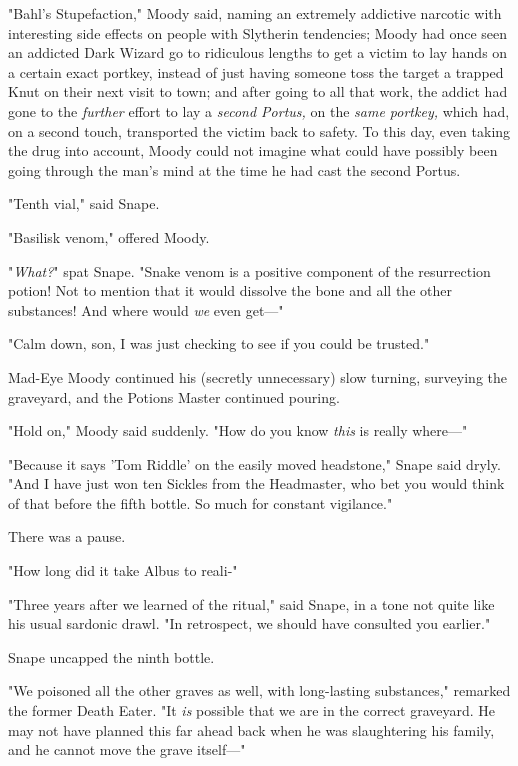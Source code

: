 "Bahl's Stupefaction," Moody said, naming an extremely addictive narcotic with 
interesting side effects on people with Slytherin tendencies; Moody had once 
seen an addicted Dark Wizard go to ridiculous lengths to get a victim to lay 
hands on a certain exact portkey, instead of just having someone toss the 
target a trapped Knut on their next visit to town; and after going to all that 
work, the addict had gone to the \emph{further} effort to lay a\emph{ second 
Portus,} on the\emph{ same portkey,} which had, on a second touch, transported 
the victim back to safety. To this day, even taking the drug into account, 
Moody could not imagine what could have possibly been going through the man's 
mind at the time he had cast the second Portus.

"Tenth vial," said Snape.

"Basilisk venom," offered Moody.

"\emph{What?}" spat Snape. "Snake venom is a positive component of the 
resurrection potion! Not to mention that it would dissolve the bone and all the 
other substances! And where would \emph{we} even get---"

"Calm down, son, I was just checking to see if you could be trusted."

Mad-Eye Moody continued his (secretly unnecessary) slow turning, surveying the 
graveyard, and the Potions Master continued pouring.

"Hold on," Moody said suddenly. "How do you know \emph{this} is really where---"

"Because it says 'Tom Riddle' on the easily moved headstone," Snape said dryly. 
"And I have just won ten Sickles from the Headmaster, who bet you would think 
of that before the fifth bottle. So much for constant vigilance."

There was a pause.

"How long did it take Albus to reali-"

"Three years after we learned of the ritual," said Snape, in a tone not quite 
like his usual sardonic drawl. "In retrospect, we should have consulted you 
earlier."

Snape uncapped the ninth bottle.

"We poisoned all the other graves as well, with long-lasting substances," 
remarked the former Death Eater. "It \emph{is} possible that we are in the 
correct graveyard. He may not have planned this far ahead back when he was 
slaughtering his family, and he cannot move the grave itself---"

